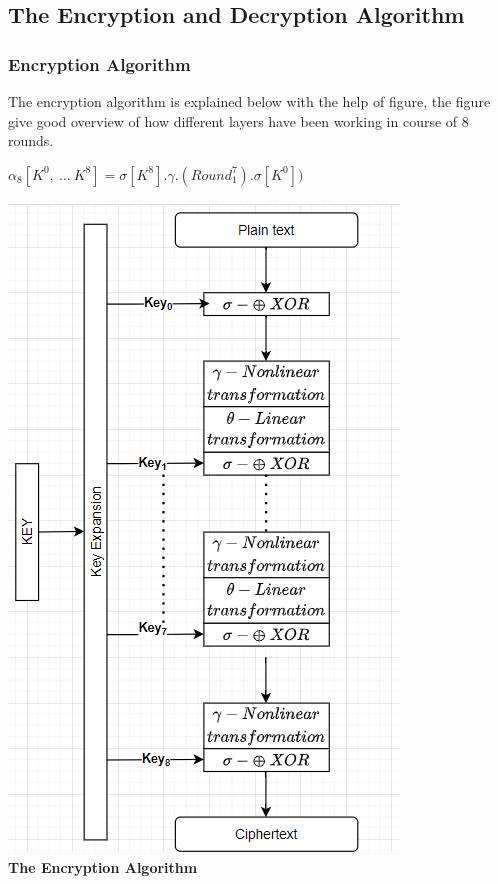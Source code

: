 \documentclass[preprint]{transcrypto}
\begin{document}
\subsection{The Encryption and Decryption Algorithm}
\subsubsection{Encryption Algorithm}
    The encryption algorithm is explained below with the help of figure, the figure give good overview of how different layers have been working in course of 8 rounds. \\
    \begin{center}
        \textbf{$ \alpha_{8}[K^0, \ \dots \ K^8] = \sigma[K^8].\gamma.\left(Round_{1}^{7}\right).\sigma[K^0])$}
    \end{center}
\begin{center}
        \includegraphics[scale=1]{Screenshots/encrypt.png}\\ 
        \textbf{The Encryption Algorithm}
\end{center} \newpage
\end{document}
